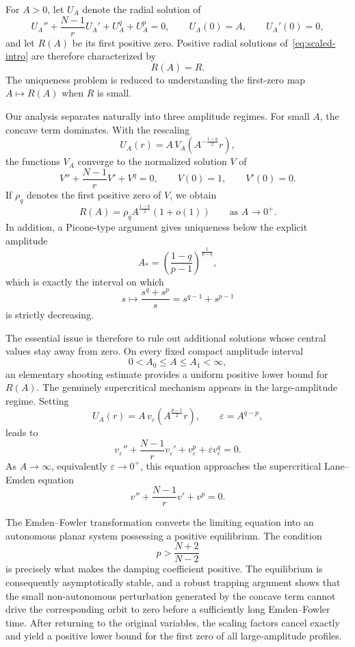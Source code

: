 \documentclass[11pt]{article}
\theoremstyle{definition}
\begin{document}
For $A>0$, let $U_A$ denote the radial solution of
\begin{equation}
\label{eq:shooting-intro}
U_A''
+\frac{N-1}{r}U_A'
+U_A^q+U_A^p=0,
\qquad
U_A(0)=A,
\qquad
U_A'(0)=0,
\end{equation}
and let $R(A)$ be its first positive zero. Positive radial solutions
of~\eqref{eq:scaled-intro} are therefore characterized by
\[
R(A)=R.
\]
The uniqueness problem is reduced to understanding the first-zero map
$A\mapsto R(A)$ when $R$ is small.

Our analysis separates naturally into three amplitude regimes. For
small $A$, the concave term dominates. With the rescaling
\[
U_A(r)
=
A\,V_A\!\left(A^{-\frac{1-q}{2}}r\right),
\]
the functions $V_A$ converge to the normalized solution $V$ of
\begin{equation}
\label{eq:pure-concave-intro}
V''
+\frac{N-1}{r}V'
+V^q=0,
\qquad
V(0)=1,
\qquad
V'(0)=0.
\end{equation}
If $\rho_q$ denotes the first positive zero of $V$, we obtain
\begin{equation}
\label{eq:R-small-intro}
R(A)
=
\rho_q A^{\frac{1-q}{2}}(1+o(1))
\qquad\text{as }A\to0^+.
\end{equation}
In addition, a Picone-type argument gives uniqueness below the
explicit amplitude
\begin{equation}
\label{eq:Astar-intro}
A_*=
\left(
\frac{1-q}{p-1}
\right)^{\frac1{p-q}},
\end{equation}
which is exactly the interval on which
\[
s\longmapsto
\frac{s^q+s^p}{s}
=
s^{q-1}+s^{p-1}
\]
is strictly decreasing.

The essential issue is therefore to rule out additional solutions
whose central values stay away from zero. On every fixed compact
amplitude interval
\[
0<A_0\leq A\leq A_1<\infty,
\]
an elementary shooting estimate provides a uniform positive lower
bound for $R(A)$. The genuinely supercritical mechanism appears in
the large-amplitude regime. Setting
\[
U_A(r)
=
A\,v_\varepsilon
\left(A^{\frac{p-1}{2}}r\right),
\qquad
\varepsilon=A^{q-p},
\]
leads to
\[
v_\varepsilon''
+\frac{N-1}{r}v_\varepsilon'
+v_\varepsilon^p
+\varepsilon v_\varepsilon^q
=0.
\]
As $A\to\infty$, equivalently $\varepsilon\to0^+$, this equation
approaches the supercritical Lane--Emden equation
\[
v''
+\frac{N-1}{r}v'
+v^p=0.
\]

The Emden--Fowler transformation converts the limiting equation into
an autonomous planar system possessing a positive equilibrium. The
condition
\[
p>\frac{N+2}{N-2}
\]
is precisely what makes the damping coefficient positive. The
equilibrium is consequently asymptotically stable, and a robust
trapping argument shows that the small non-autonomous perturbation
generated by the concave term cannot drive the corresponding orbit
to zero before a sufficiently long Emden--Fowler time. After
returning to the original variables, the scaling factors cancel
exactly and yield a positive lower bound for the first zero of all
large-amplitude profiles.
\end{document}
